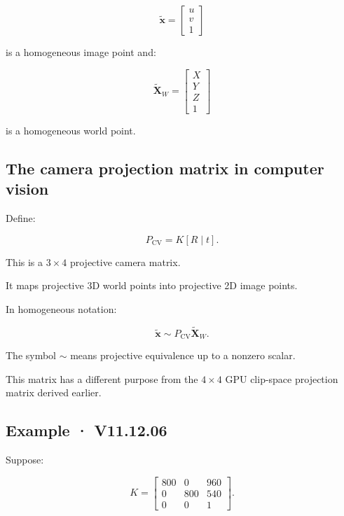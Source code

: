 \[
 \tilde{\mathbf x}= \begin{bmatrix}u\\v\\1\end{bmatrix}
\]

is a homogeneous image point and:

\[
 \tilde{\mathbf X}_W= \begin{bmatrix}X\\Y\\Z\\1\end{bmatrix}
\]

is a homogeneous world point.

\subsection{The camera projection matrix in computer vision}\label{02-foundations-ii-ch035-the-camera-projection-matrix-in-computer-vision}

Define:

\[
 \boxed{ P_{\mathrm{CV}}=K[R\mid t] }.
\]

This is a \(3\times4\) projective camera matrix.

It maps projective 3D world points into projective 2D image points.

In homogeneous notation:

\[
 \boxed{ \tilde{\mathbf x}\sim P_{\mathrm{CV}}\tilde{\mathbf X}_W }.
\]

The symbol \(\sim\) means projective equivalence up to a nonzero scalar.

This matrix has a different purpose from the \(4\times4\) GPU clip-space projection matrix derived earlier.

\begin{allmightroleexample}

\subsection{Example · V11.12.06}\label{02-foundations-ii-ch035-example-v11.12.06}

Suppose:

\end{allmightroleexample}

\[
 K= \begin{bmatrix} 800&0&960\\ 0&800&540\\ 0&0&1 \end{bmatrix}.
\]

